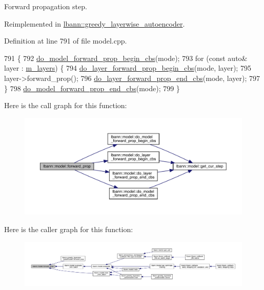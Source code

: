 Forward propagation step. 

Reimplemented in \hyperlink{classlbann_1_1greedy__layerwise__autoencoder_af16aa7d2336a3f64e27970241cb2cd3e}{lbann\+::greedy\+\_\+layerwise\+\_\+autoencoder}.



Definition at line 791 of file model.\+cpp.


\begin{DoxyCode}
791                                             \{
792   \hyperlink{classlbann_1_1model_af3c45642bbacf1bd07e8504d7e689ec0}{do\_model\_forward\_prop\_begin\_cbs}(mode);
793   \textcolor{keywordflow}{for} (\textcolor{keyword}{const} \textcolor{keyword}{auto}& layer : \hyperlink{classlbann_1_1model_a0229fc226ec163d1411548446104569d}{m\_layers}) \{
794     \hyperlink{classlbann_1_1model_ac19ce0dd060f9caddd6e14974a6e7713}{do\_layer\_forward\_prop\_begin\_cbs}(mode, layer);
795     layer->forward\_prop();
796     \hyperlink{classlbann_1_1model_a7d6b891f58a7df9726e4f2c48d1f957a}{do\_layer\_forward\_prop\_end\_cbs}(mode, layer);
797   \}
798   \hyperlink{classlbann_1_1model_a9d67f4f3a027327d2db8767759f9c2bf}{do\_model\_forward\_prop\_end\_cbs}(mode);
799 \}
\end{DoxyCode}
Here is the call graph for this function\+:\nopagebreak
\begin{figure}[H]
\begin{center}
\leavevmode
\includegraphics[width=350pt]{classlbann_1_1model_adc4f845c8e292afe2d8686f459729484_cgraph}
\end{center}
\end{figure}
Here is the caller graph for this function\+:\nopagebreak
\begin{figure}[H]
\begin{center}
\leavevmode
\includegraphics[width=350pt]{classlbann_1_1model_adc4f845c8e292afe2d8686f459729484_icgraph}
\end{center}
\end{figure}
\mbox{\label{classlbann_1_1model_ad0131e36e763470a7bbf67e83b42cd14}} 
